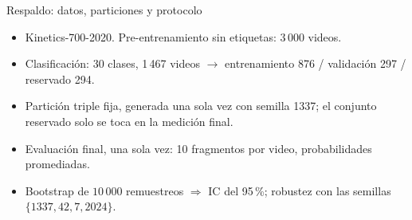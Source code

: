 \documentclass[aspectratio=169,10pt]{beamer}
\begin{document}
\begin{frame}{Respaldo: datos, particiones y protocolo}
  \small
  \begin{itemize}
    \item Kinetics-700-2020. Pre-entrenamiento sin etiquetas: 3\,000 videos.
    \item Clasificación: 30 clases, 1\,467 videos $\rightarrow$
          entrenamiento 876 / validación 297 / \alert{reservado 294}.
    \item Partición triple \alert{fija}, generada una sola vez con semilla
          1337; el conjunto reservado solo se toca en la medición final.
    \item Evaluación final, una sola vez: 10 fragmentos por video,
          probabilidades promediadas.
    \item Bootstrap de $10\,000$ remuestreos $\Rightarrow$ IC del 95\,\%;
          robustez con las semillas $\{1337, 42, 7, 2024\}$.
  \end{itemize}
\end{frame}
\end{document}

